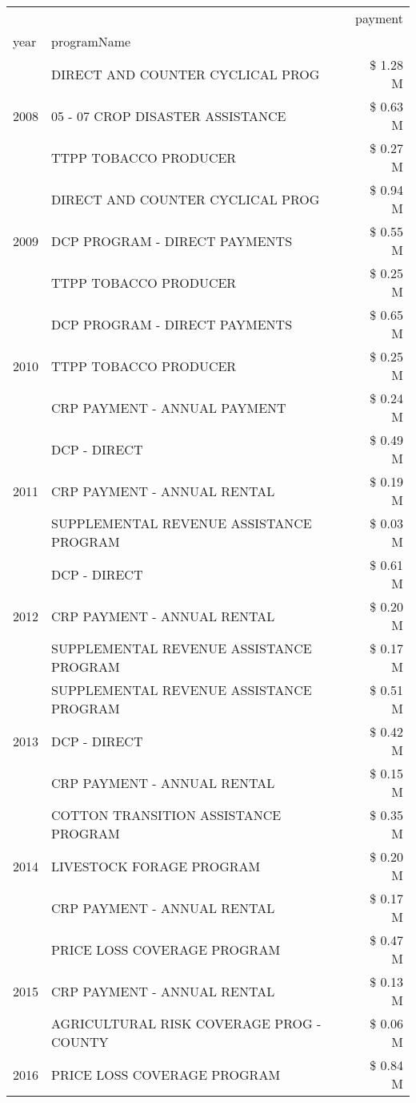\begin{tabular}{llr}
\toprule
 &  & payment \\
year & programName &  \\
\midrule
\multirow[t]{3}{*}{2008} & DIRECT AND COUNTER CYCLICAL PROG & \$ 1.28 M \\
 & 05 - 07 CROP DISASTER ASSISTANCE & \$ 0.63 M \\
 & TTPP TOBACCO PRODUCER & \$ 0.27 M \\
\cline{1-3}
\multirow[t]{3}{*}{2009} & DIRECT AND COUNTER CYCLICAL PROG & \$ 0.94 M \\
 & DCP PROGRAM - DIRECT PAYMENTS & \$ 0.55 M \\
 & TTPP TOBACCO PRODUCER & \$ 0.25 M \\
\cline{1-3}
\multirow[t]{3}{*}{2010} & DCP PROGRAM - DIRECT PAYMENTS & \$ 0.65 M \\
 & TTPP TOBACCO PRODUCER & \$ 0.25 M \\
 & CRP PAYMENT - ANNUAL PAYMENT & \$ 0.24 M \\
\cline{1-3}
\multirow[t]{3}{*}{2011} & DCP - DIRECT & \$ 0.49 M \\
 & CRP PAYMENT - ANNUAL RENTAL & \$ 0.19 M \\
 & SUPPLEMENTAL REVENUE ASSISTANCE PROGRAM & \$ 0.03 M \\
\cline{1-3}
\multirow[t]{3}{*}{2012} & DCP - DIRECT & \$ 0.61 M \\
 & CRP PAYMENT - ANNUAL RENTAL & \$ 0.20 M \\
 & SUPPLEMENTAL REVENUE ASSISTANCE PROGRAM & \$ 0.17 M \\
\cline{1-3}
\multirow[t]{3}{*}{2013} & SUPPLEMENTAL REVENUE ASSISTANCE PROGRAM & \$ 0.51 M \\
 & DCP - DIRECT & \$ 0.42 M \\
 & CRP PAYMENT - ANNUAL RENTAL & \$ 0.15 M \\
\cline{1-3}
\multirow[t]{3}{*}{2014} & COTTON TRANSITION ASSISTANCE PROGRAM & \$ 0.35 M \\
 & LIVESTOCK FORAGE PROGRAM & \$ 0.20 M \\
 & CRP PAYMENT - ANNUAL RENTAL & \$ 0.17 M \\
\cline{1-3}
\multirow[t]{3}{*}{2015} & PRICE LOSS COVERAGE PROGRAM & \$ 0.47 M \\
 & CRP PAYMENT - ANNUAL RENTAL & \$ 0.13 M \\
 & AGRICULTURAL RISK COVERAGE PROG - COUNTY & \$ 0.06 M \\
\cline{1-3}
\multirow[t]{3}{*}{2016} & PRICE LOSS COVERAGE PROGRAM                   & \$ 0.84 M \\

\end{tabular}
